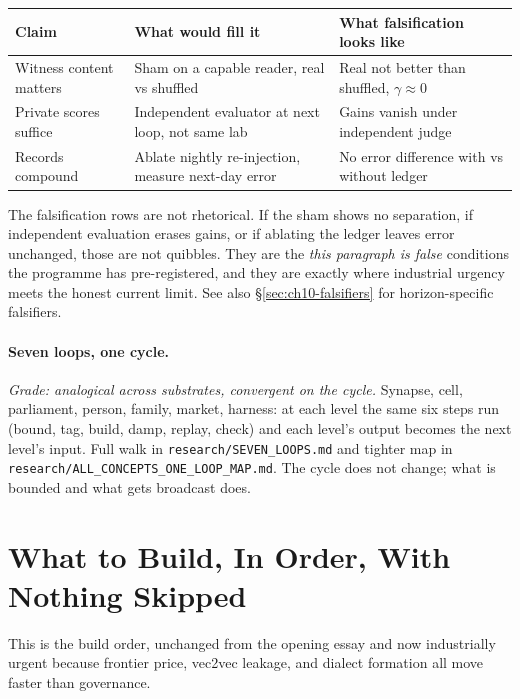 \begin{center}
\small
\begin{tabular}{p{4.4cm}p{4.4cm}p{4.0cm}}
\toprule
Claim & What would fill it & What falsification looks like \\
\midrule
Witness content matters & Sham on a capable reader, real vs shuffled & Real not better than shuffled, $\gamma\approx0$ \\
Private scores suffice & Independent evaluator at next loop, not same lab & Gains vanish under independent judge \\
Records compound & Ablate nightly re-injection, measure next-day error & No error difference with vs without ledger \\
\bottomrule
\end{tabular}
\end{center}

The falsification rows are not rhetorical. If the sham shows no separation, if independent evaluation erases gains, or if ablating the ledger leaves error unchanged, those are not quibbles. They are the \emph{this paragraph is false} conditions the programme has pre-registered, and they are exactly where industrial urgency meets the honest current limit. See also \S\ref{sec:ch10-falsifiers} for horizon-specific falsifiers.

\paragraph{Seven loops, one cycle.} \textit{Grade: analogical across substrates, convergent on the cycle.} Synapse, cell, parliament, person, family, market, harness: at each level the same six steps run (bound, tag, build, damp, replay, check) and each level's output becomes the next level's input. Full walk in \texttt{research/SEVEN\_LOOPS.md} and tighter map in \texttt{research/ALL\_CONCEPTS\_ONE\_LOOP\_MAP.md}. The cycle does not change; what is bounded and what gets broadcast does.

\section{What to Build, In Order, With Nothing Skipped}
\label{sec:ch10-build}

This is the build order, unchanged from the opening essay and now industrially urgent because frontier price, vec2vec leakage, and dialect formation all move faster than governance.

